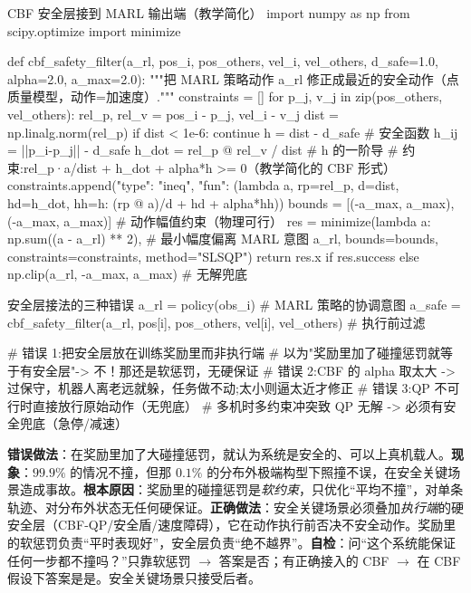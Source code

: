 \begin{codebox}[Python]{CBF 安全层接到 MARL 输出端（教学简化）}
import numpy as np
from scipy.optimize import minimize

def cbf_safety_filter(a_rl, pos_i, pos_others, vel_i, vel_others,
                      d_safe=1.0, alpha=2.0, a_max=2.0):
    """把 MARL 策略动作 a_rl 修正成最近的安全动作（点质量模型，动作=加速度）."""
    constraints = []
    for p_j, v_j in zip(pos_others, vel_others):
        rel_p, rel_v = pos_i - p_j, vel_i - v_j
        dist = np.linalg.norm(rel_p)
        if dist < 1e-6:
            continue
        h = dist - d_safe                          # 安全函数 h_ij = ||p_i-p_j|| - d_safe
        h_dot = rel_p @ rel_v / dist               # h 的一阶导
        # 约束:rel_p·a/dist + h_dot + alpha*h >= 0（教学简化的 CBF 形式）
        constraints.append({"type": "ineq",
            "fun": (lambda a, rp=rel_p, d=dist, hd=h_dot, hh=h: (rp @ a)/d + hd + alpha*hh)})
    bounds = [(-a_max, a_max), (-a_max, a_max)]     # 动作幅值约束（物理可行）
    res = minimize(lambda a: np.sum((a - a_rl) ** 2),   # 最小幅度偏离 MARL 意图
                   a_rl, bounds=bounds, constraints=constraints, method="SLSQP")
    return res.x if res.success else np.clip(a_rl, -a_max, a_max)   # 无解兜底
\end{codebox}

\begin{codebox}[Python]{安全层接法的三种错误}
a_rl  = policy(obs_i)                              # MARL 策略的协调意图
a_safe = cbf_safety_filter(a_rl, pos[i], pos_others, vel[i], vel_others)  # 执行前过滤

# 错误 1:把安全层放在训练奖励里而非执行端
#   以为"奖励里加了碰撞惩罚就等于有安全层"-> 不！那还是软惩罚，无硬保证
# 错误 2:CBF 的 alpha 取太大 -> 过保守，机器人离老远就躲，任务做不动;太小则逼太近才修正
# 错误 3:QP 不可行时直接放行原始动作（无兜底）
#   多机时多约束冲突致 QP 无解 -> 必须有安全兜底（急停/减速）
\end{codebox}

\begin{pitfall}
\textbf{错误做法}：在奖励里加了大碰撞惩罚，就认为系统是安全的、可以上真机载人。\textbf{现象}：$99.9\%$ 的情况不撞，但那 $0.1\%$ 的分布外极端构型下照撞不误，在安全关键场景造成事故。\textbf{根本原因}：奖励里的碰撞惩罚是\emph{软约束}，只优化“平均不撞”，对单条轨迹、对分布外状态无任何硬保证。\textbf{正确做法}：安全关键场景必须叠加\emph{执行端}的硬安全层（CBF-QP/安全盾/速度障碍），它在动作执行前否决不安全动作。奖励里的软惩罚负责“平时表现好”，安全层负责“绝不越界”。\textbf{自检}：问“这个系统能保证任何一步都不撞吗？”只靠软惩罚 $\to$ 答案是否；有正确接入的 CBF $\to$ 在 CBF 假设下答案是是。安全关键场景只接受后者。
\end{pitfall}

